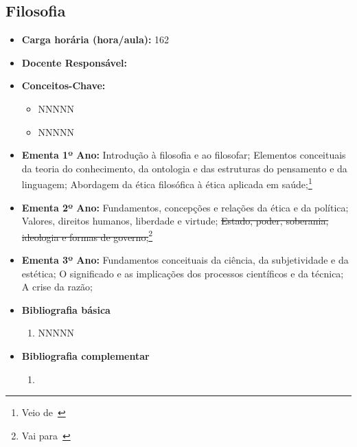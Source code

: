 \documentclass[11pt,fleqn]{book} %
\newcommand{\VER}[1]{\begingroup\color{red}#1\endgroup}
\begin{document}
\subsection{Filosofia}\label{disc:filosofia}
\begin{itemize}
	\item \textbf{Carga horária (hora/aula):} 162
	\item \textbf{Docente Responsável:}
	\item \textbf{Conceitos-Chave:}
	\begin{itemize}
		\item NNNNN
		\item NNNNN
	\end{itemize}
	\item \textbf{Ementa 1º Ano:} 
	Introdução à filosofia e ao filosofar;
	Elementos conceituais da teoria do conhecimento, da ontologia e das estruturas do pensamento e da linguagem;
	\VER{Abordagem da ética filosófica à ética aplicada em saúde;}\footnote{Veio de~} 
	\item \textbf{Ementa 2º Ano:} 	
	Fundamentos, concepções e relações da ética e da política; 
	Valores, direitos humanos, liberdade e virtude;
	\sout{Estado, poder, soberania, ideologia e formas de governo;}\footnote{Vai para~}
	\item \textbf{Ementa 3º Ano:} 
	Fundamentos conceituais da ciência, da subjetividade e da estética;
	O significado e as implicações dos processos científicos e da técnica; 
	A crise da razão;
	\item \textbf{Bibliografia básica}
	\begin{enumerate}
		\item NNNNN
	\end{enumerate}
	\item \textbf{Bibliografia complementar}
	\begin{enumerate}
		\item 
	\end{enumerate}	
\end{itemize}


\newpage
\end{document}
